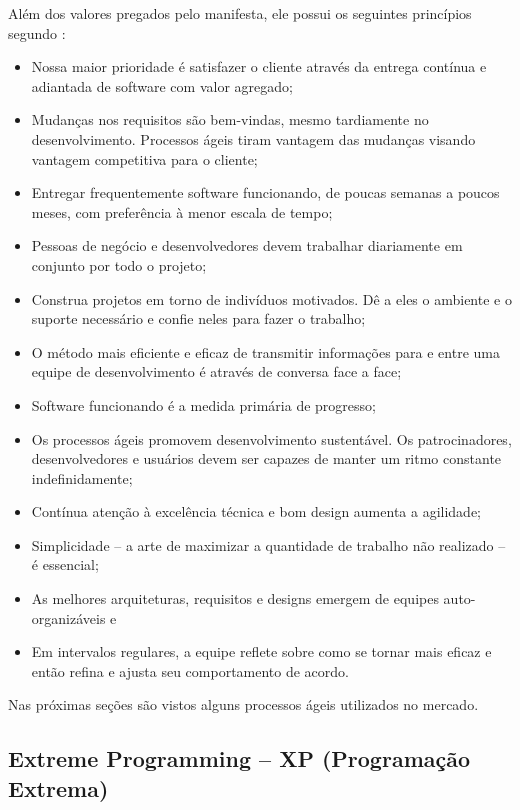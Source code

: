 Além dos valores pregados pelo manifesta, ele possui os seguintes princípios segundo :

\begin{citacao}
\begin{itemize}
	\item Nossa maior prioridade é satisfazer o cliente através da entrega contínua e adiantada de software com valor agregado;
	\item Mudanças nos requisitos são bem-vindas, mesmo tardiamente no desenvolvimento. Processos ágeis tiram vantagem das mudanças visando vantagem competitiva para o cliente;
	\item Entregar frequentemente software funcionando, de poucas semanas a poucos meses, com preferência à menor escala de tempo;
	\item Pessoas de negócio e desenvolvedores devem trabalhar diariamente em conjunto por todo o projeto;
	\item Construa projetos em torno de indivíduos motivados. Dê a eles o ambiente e o suporte necessário e confie neles para fazer o trabalho;
	\item O método mais eficiente e eficaz de transmitir informações para e entre uma equipe de desenvolvimento é através de conversa face a face;
	\item Software funcionando é a medida primária de progresso;
	\item Os processos ágeis promovem desenvolvimento sustentável. Os patrocinadores, desenvolvedores e usuários devem ser capazes de manter um ritmo constante indefinidamente;
	\item Contínua atenção à excelência técnica e bom design aumenta a agilidade;
	\item Simplicidade -- a arte de maximizar a quantidade de trabalho não realizado -- é essencial;
	\item As melhores arquiteturas, requisitos e designs emergem de equipes auto-organizáveis e
	\item Em intervalos regulares, a equipe reflete sobre como se tornar mais eficaz e então refina e ajusta seu comportamento de acordo.
\end{itemize}
\end{citacao}

Nas próximas seções são vistos alguns processos ágeis utilizados no mercado.

\subsection{Extreme Programming -- XP (Programação Extrema)}

